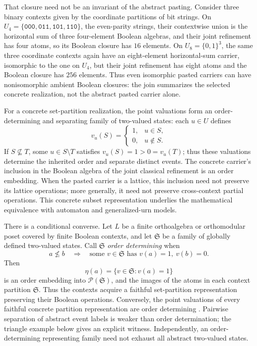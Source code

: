 \documentclass[aps,pra,reprint,nofootinbib]{revtex4-2}
\newcommand{\Pow}{\mathcal{P}}
\begin{document}
That closure need not be an invariant of the abstract pasting.  Consider three
binary contexts given by the coordinate partitions of bit strings.  On
$U_4=\{\mathtt{000},\mathtt{011},\mathtt{101},\mathtt{110}\}$, the even-parity
strings, their contextwise union is
the horizontal sum of three four-element Boolean algebras, and their joint
refinement has four atoms, so its Boolean closure has $16$ elements.  On
$U_8=\{0,1\}^3$, the same three coordinate contexts again have an eight-element
horizontal-sum carrier, isomorphic to the one on $U_4$, but their joint
refinement has eight atoms and the Boolean closure has $256$ elements.  Thus
even isomorphic pasted carriers can have nonisomorphic ambient Boolean
closures: the join summarizes the selected concrete realization, not the
abstract pasted carrier alone.

For a concrete set-partition realization, the point valuations form an
order-determining and separating family of two-valued states: each $u\in U$
defines
\begin{equation}
  v_u(S)=
  \begin{cases}
  1,&u\in S,\\
  0,&u\notin S.
  \end{cases}
  \label{eq:point-valuation}
\end{equation}
If $S\nsubseteq T$, some $u\in S\setminus T$ satisfies
$v_u(S)=1>0=v_u(T)$; thus these valuations determine the inherited order and
separate distinct events.  The concrete carrier's inclusion in the Boolean
algebra
of the joint classical refinement is an order embedding.  When the pasted
carrier is a lattice, this inclusion need not preserve its lattice operations;
more generally, it need not preserve cross-context partial operations.  This
concrete subset representation underlies the
mathematical equivalence with automaton and generalized-urn models.

There is a conditional converse.  Let $L$ be a finite orthoalgebra or
orthomodular poset covered by finite Boolean contexts, and let $\mathfrak S$ be
a family of globally defined two-valued states.  Call $\mathfrak S$
\emph{order determining}
when
\begin{equation}
  a\nleq b
  \quad\Longrightarrow\quad
  \text{some }v\in\mathfrak S\text{ has }v(a)=1,
  \ v(b)=0.
  \label{eq:order-determining-states}
\end{equation}
Then
\begin{equation}
  \eta(a)=\{v\in\mathfrak S:v(a)=1\}
  \label{eq:state-set-representation}
\end{equation}
is an order embedding into $\Pow(\mathfrak S)$, and the images of the atoms in
each context partition $\mathfrak S$.  Thus the contexts acquire a faithful
set-partition representation preserving their Boolean operations.  Conversely,
the point valuations of every faithful concrete partition representation are
order determining
\cite{schaller-95,dvur-pul-svo,svozil-2008-ql}.  Pairwise separation of abstract
event labels is weaker than order determination; the triangle example below
gives an explicit witness.  Independently, an order-determining representing
family need not exhaust all abstract two-valued states.
\end{document}
